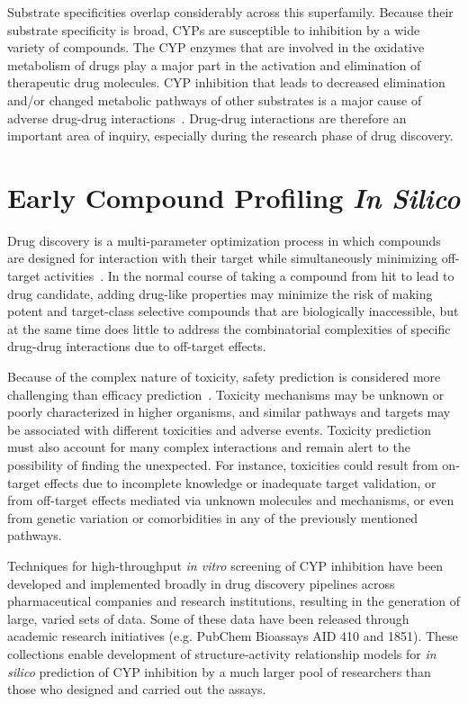 Substrate specificities overlap considerably across this superfamily. Because their substrate specificity is broad, CYPs are susceptible to inhibition by a wide variety of compounds. The CYP enzymes that are involved in the oxidative metabolism of drugs play a major part in the activation and elimination of therapeutic drug molecules. CYP inhibition that leads to decreased elimination and/or changed metabolic pathways of other substrates is a major cause of adverse drug-drug interactions~\cite{Lapins2013}. Drug-drug interactions are therefore an important area of inquiry, especially during the research phase of drug discovery.


\section{Early Compound Profiling \textit{In Silico}}

Drug discovery is a multi-parameter optimization process in which compounds are designed for interaction with their target while simultaneously minimizing off-target activities~\cite{Zlokarnik2005}. In the normal course of taking a compound from hit to lead to drug candidate, adding drug-like properties may minimize the risk of making potent and target-class selective compounds that are biologically inaccessible, but at the same time does little to address the combinatorial complexities of specific drug-drug interactions due to off-target effects.

Because of the complex nature of toxicity, safety prediction is considered more challenging than efficacy prediction~\cite{Kruhlak2012}. Toxicity mechanisms may be unknown or poorly characterized in higher organisms, and similar pathways and targets may be associated with different toxicities and adverse events. Toxicity prediction must also account for many complex interactions and remain alert to the possibility of finding the unexpected. For instance, toxicities could result from on-target effects due to incomplete knowledge or inadequate target validation, or from off-target effects mediated via unknown molecules and mechanisms, or even from genetic variation or comorbidities in any of the previously mentioned pathways.

Techniques for high-throughput \textit{in vitro} screening of CYP inhibition have been developed and implemented broadly in drug discovery pipelines across pharmaceutical companies and research institutions, resulting in the generation of large, varied sets of data. Some of these data have been released through academic research initiatives (e.g. PubChem Bioassays AID 410 and 1851). These collections enable development of structure-activity relationship models for \textit{in silico} prediction of CYP inhibition by a much larger pool of researchers than those who designed and carried out the assays.

